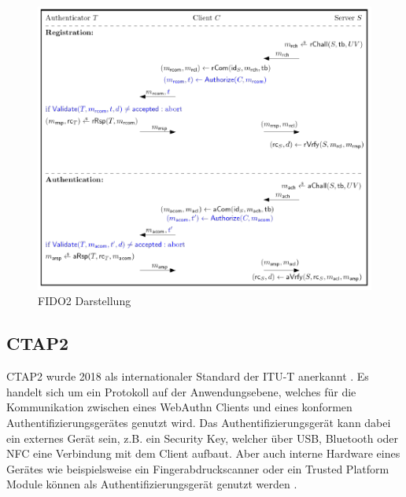\begin{figure}[H]
	\centering 
	\includegraphics[width=1\textwidth]{img/abbildungen/Fido2.png}
	\captionsetup{format=hang}
	\caption{FIDO2 Darstellung} \label{fido2-process}
\end{figure}

\subsection{CTAP2}

\ac{CTAP2} wurde 2018 als internationaler Standard der \ac{ITU-T} anerkannt \cite{barbosa2021provable}. Es handelt sich um ein Protokoll auf der Anwendungsebene, welches für die Kommunikation zwischen eines WebAuthn Clients und eines konformen Authentifizierungsgerätes genutzt wird. Das Authentifizierungsgerät kann dabei ein externes Gerät sein, z.B. ein Security Key, welcher über USB, Bluetooth oder NFC eine Verbindung mit dem Client aufbaut. Aber auch interne Hardware eines Gerätes wie beispielsweise ein Fingerabdruckscanner oder ein Trusted Platform Module können als Authentifizierungsgerät genutzt werden \cite{lyastani2020fido2}.


